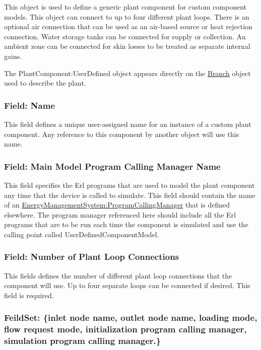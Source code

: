 This object is used to define a generic plant component for custom component models. This object can connect to up to four different plant loops. There is an optional air connection that can be used as an air-based source or heat rejection connection. Water storage tanks can be connected for supply or collection. An ambient zone can be connected for skin losses to be treated as separate internal gains.

The PlantComponent:UserDefined object appears directly on the \hyperref[branch]{Branch} object used to describe the plant.

\subsubsection{Field: Name}\label{field-name-3-035}

This field defines a unique user-assigned name for an instance of a custom plant component. Any reference to this component by another object will use this name.

\subsubsection{Field: Main Model Program Calling Manager Name}\label{field-main-model-program-calling-manager-name}

This field specifies the Erl programs that are used to model the plant component any time that the device is called to simulate. This field should contain the name of an \hyperref[energymanagementsystemprogramcallingmanager]{EnergyManagementSystem:ProgramCallingManager} that is defined elsewhere. The program manager referenced here should include all the Erl programs that are to be run each time the component is simulated and use the calling point called UserDefinedComponentModel.

\subsubsection{Field: Number of Plant Loop Connections}\label{field-number-of-plant-loop-connections-2}

This fields defines the number of different plant loop connections that the component will use. Up to four separate loops can be connected if desired. This field is required.

\subsubsection{FeildSet: \{inlet node name, outlet node name, loading mode, flow request mode, initialization program calling manager, simulation program calling manager.\}}\label{feildset-inlet-node-name-outlet-node-name-loading-mode-flow-request-mode-initialization-program-calling-manager-simulation-program-calling-manager.}

